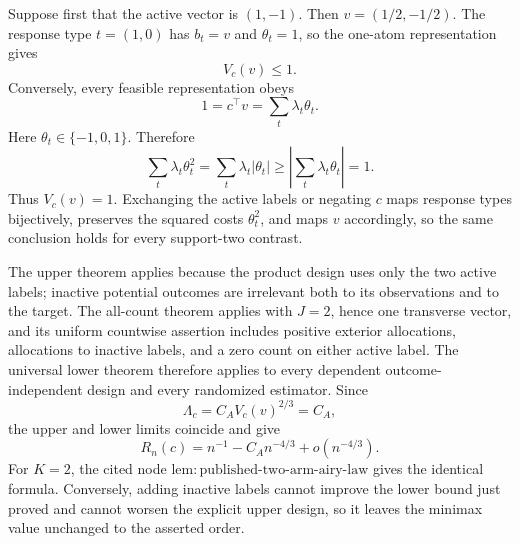Suppose first that the active vector is \((1,-1)\).  Then
\(v=(1/2,-1/2)\).  The response type \(t=(1,0)\) has
\(b_t=v\) and \(\theta_t=1\), so the one-atom representation gives
\[
V_c(v)\le1.
\tag{16}
\]
Conversely, every feasible representation obeys
\[
1=c^\top v=\sum_t\lambda_t\theta_t.
\tag{17}
\]
Here \(\theta_t\in\{-1,0,1\}\).  Therefore
\[
\sum_t\lambda_t\theta_t^2
=\sum_t\lambda_t|\theta_t|
\ge\left|\sum_t\lambda_t\theta_t\right|=1.
\tag{18}
\]
Thus \(V_c(v)=1\).  Exchanging the active labels or negating \(c\) maps response types bijectively, preserves the squared costs \(\theta_t^2\), and maps \(v\) accordingly, so the same conclusion holds for every support-two contrast.

The upper theorem applies because the product design uses only the two active labels; inactive potential outcomes are irrelevant both to its observations and to the target.  The all-count theorem applies with \(J=2\), hence one transverse vector, and its uniform countwise assertion includes positive exterior allocations, allocations to inactive labels, and a zero count on either active label.  The universal lower theorem therefore applies to every dependent outcome-independent design and every randomized estimator.  Since
\[
\Lambda_c=C_AV_c(v)^{2/3}=C_A,
\]
the upper and lower limits coincide and give
\[
R_n(c)=n^{-1}-C_An^{-4/3}+o(n^{-4/3}).
\]
For \(K=2\), the cited node
\(\mathrm{lem:published\text{-}two\text{-}arm\text{-}airy\text{-}law}\)
gives the identical formula.  Conversely, adding inactive labels cannot improve the lower bound just proved and cannot worsen the explicit upper design, so it leaves the minimax value unchanged to the asserted order.
